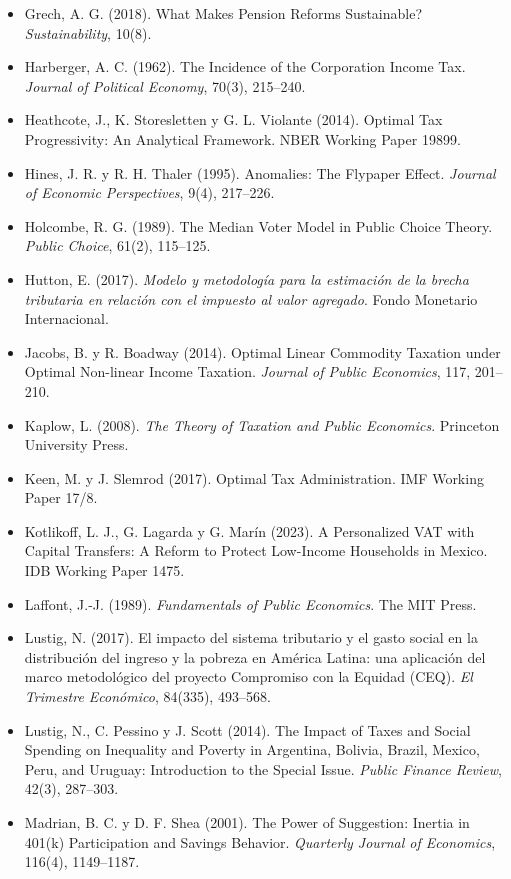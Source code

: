 \documentclass[11pt,a4paper]{article}
\begin{document}
{\begin{itemize}[leftmargin=1.4em,itemsep=1pt,label={}]
\item Grech, A. G. (2018). What Makes Pension Reforms Sustainable? \emph{Sustainability}, 10(8).
\item Harberger, A. C. (1962). The Incidence of the Corporation Income Tax. \emph{Journal of Political Economy}, 70(3), 215--240.
\item Heathcote, J., K. Storesletten y G. L. Violante (2014). Optimal Tax Progressivity: An Analytical Framework. NBER Working Paper 19899.
\item Hines, J. R. y R. H. Thaler (1995). Anomalies: The Flypaper Effect. \emph{Journal of Economic Perspectives}, 9(4), 217--226.
\item Holcombe, R. G. (1989). The Median Voter Model in Public Choice Theory. \emph{Public Choice}, 61(2), 115--125.
\item Hutton, E. (2017). \emph{Modelo y metodología para la estimación de la brecha tributaria en relación con el impuesto al valor agregado}. Fondo Monetario Internacional.
\item Jacobs, B. y R. Boadway (2014). Optimal Linear Commodity Taxation under Optimal Non-linear Income Taxation. \emph{Journal of Public Economics}, 117, 201--210.
\item Kaplow, L. (2008). \emph{The Theory of Taxation and Public Economics}. Princeton University Press.
\item Keen, M. y J. Slemrod (2017). Optimal Tax Administration. IMF Working Paper 17/8.
\item Kotlikoff, L. J., G. Lagarda y G. Marín (2023). A Personalized VAT with Capital Transfers: A Reform to Protect Low-Income Households in Mexico. IDB Working Paper 1475.
\item Laffont, J.-J. (1989). \emph{Fundamentals of Public Economics}. The MIT Press.
\item Lustig, N. (2017). El impacto del sistema tributario y el gasto social en la distribución del ingreso y la pobreza en América Latina: una aplicación del marco metodológico del proyecto Compromiso con la Equidad (CEQ). \emph{El Trimestre Económico}, 84(335), 493--568.
\item Lustig, N., C. Pessino y J. Scott (2014). The Impact of Taxes and Social Spending on Inequality and Poverty in Argentina, Bolivia, Brazil, Mexico, Peru, and Uruguay: Introduction to the Special Issue. \emph{Public Finance Review}, 42(3), 287--303.
\item Madrian, B. C. y D. F. Shea (2001). The Power of Suggestion: Inertia in 401(k) Participation and Savings Behavior. \emph{Quarterly Journal of Economics}, 116(4), 1149--1187.

\end{itemize}}
\end{document}
